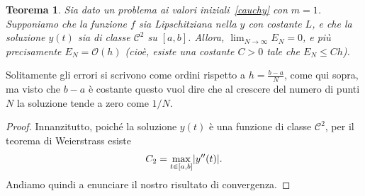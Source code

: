 \documentclass[a4paper]{report}
\DeclarePairedDelimiter{\abs}{\lvert}{\rvert}
\newtheorem{theorem}{Teorema}[chapter]
\theoremstyle{definiton}
\theoremstyle{remark}
\begin{document}
\begin{theorem}
Sia dato un problema ai valori iniziali~\eqref{cauchy} con $m=1$. Supponiamo che la funzione $f$ sia Lipschitziana nella $y$ con costante $L$, e che la soluzione $y(t)$ sia di classe $\mathcal{C}^2$ su $[a,b]$. Allora, $\lim_{N\to \infty} E_N = 0$, e più precisamente $E_N = \mathcal{O}(h)$ (cioè, esiste una costante $C>0$ tale che $E_N \leq Ch$).
\end{theorem}
Solitamente gli errori si scrivono come ordini rispetto a $h = \frac{b-a}{N}$, come qui sopra, ma visto che $b-a$ è costante questo vuol dire che al crescere del numero di punti $N$ la soluzione tende a zero come $1/N$.
\begin{proof}
Innanzitutto, poiché la soluzione $y(t)$ è una funzione di classe $\mathcal{C}^2$, per il teorema di Weierstrass esiste
\[
C_2 = \max_{t\in [a,b]} \abs{y''(t)}.
\]
Andiamo quindi a enunciare il nostro risultato di convergenza.
    

\end{proof}
\end{document}
